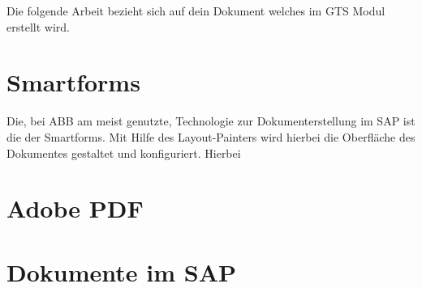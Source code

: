 Die folgende Arbeit bezieht sich auf dein Dokument welches im \ac{GTS} Modul erstellt wird.  




\section{Smartforms}
Die, bei ABB am meist genutzte, Technologie zur Dokumenterstellung im SAP ist die der Smartforms. Mit Hilfe des Layout-Painters wird hierbei die Oberfläche des Dokumentes gestaltet und konfiguriert. Hierbei

\section{Adobe PDF}

\section{Dokumente im SAP}